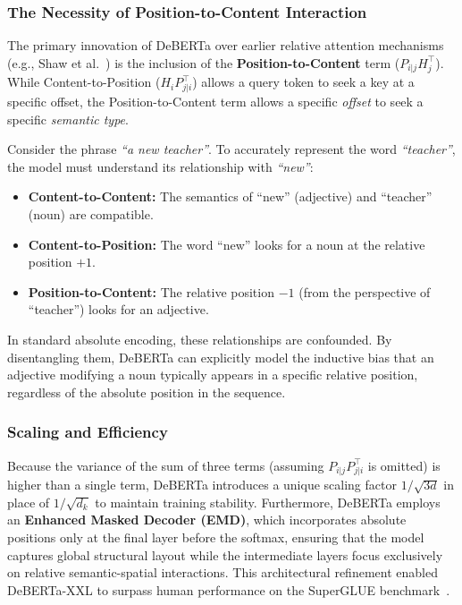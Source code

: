 \documentclass[11pt]{article}
\begin{document}
\subsubsection{The Necessity of Position-to-Content Interaction}
The primary innovation of DeBERTa over earlier relative attention mechanisms (e.g., Shaw et al.~\cite{shaw2018self}) is the inclusion of the \textbf{Position-to-Content} term ($P_{i|j} H_j^\top$). While Content-to-Position ($H_i P_{j|i}^\top$) allows a query token to seek a key at a specific offset, the Position-to-Content term allows a specific \emph{offset} to seek a specific \emph{semantic type}.

Consider the phrase \textit{``a new teacher''}. To accurately represent the word \textit{``teacher''}, the model must understand its relationship with \textit{``new''}:
\begin{itemize}
    \item \textbf{Content-to-Content:} The semantics of ``new'' (adjective) and ``teacher'' (noun) are compatible.
    \item \textbf{Content-to-Position:} The word ``new'' looks for a noun at the relative position $+1$.
    \item \textbf{Position-to-Content:} The relative position $-1$ (from the perspective of ``teacher'') looks for an adjective. 
\end{itemize}
In standard absolute encoding, these relationships are confounded. By disentangling them, DeBERTa can explicitly model the inductive bias that an adjective modifying a noun typically appears in a specific relative position, regardless of the absolute position in the sequence.

\subsubsection{Scaling and Efficiency}
Because the variance of the sum of three terms (assuming $P_{i|j} P_{j|i}^\top$ is omitted) is higher than a single term, DeBERTa introduces a unique scaling factor $1/\sqrt{3d}$ in place of $1/\sqrt{d_k}$ to maintain training stability. Furthermore, DeBERTa employs an \textbf{Enhanced Masked Decoder (EMD)}, which incorporates absolute positions only at the final layer before the softmax, ensuring that the model captures global structural layout while the intermediate layers focus exclusively on relative semantic-spatial interactions. This architectural refinement enabled DeBERTa-XXL to surpass human performance on the SuperGLUE benchmark~\cite{he2020deberta}.
\end{document}

